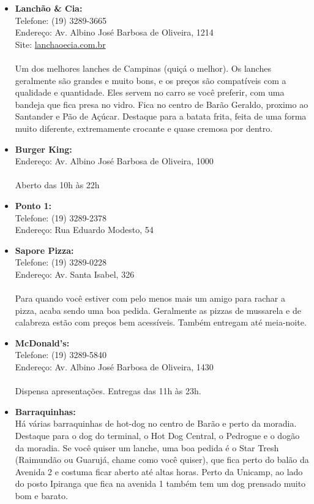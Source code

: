 \begin{itemize}
\item   \textbf{Lanchão \& Cia:}
        \\Telefone: (19) 3289-3665
        \\Endereço: Av. Albino José Barbosa de Oliveira, 1214
        \\Site: \url{lanchaoecia.com.br}
        \\\\Um dos melhores lanches de Campinas (quiçá o melhor). Os lanches
        geralmente são grandes e muito bons, e os preços são compatíveis com a
        qualidade e quantidade. Eles servem no carro se você preferir, com uma
        bandeja que fica presa no vidro. Fica no centro de Barão Geraldo,
        proximo ao Santander e Pão de Açúcar. Destaque para a batata frita,
        feita de uma forma muito diferente, extremamente crocante e quase
        cremosa por dentro.

\item   \textbf{Burger King:}
        \\Endereço: Av. Albino José Barbosa de Oliveira, 1000
        \\\\Aberto das 10h às 22h

\item   \textbf{Ponto 1:}
        \\Telefone: (19) 3289-2378
        \\Endereço: Rua Eduardo Modesto, 54

\item   \textbf{Sapore Pizza:}
        \\Telefone: (19) 3289-0228
        \\Endereço: Av. Santa Isabel, 326
        \\\\Para quando você estiver com pelo menos mais um amigo para rachar a
        pizza, acaba sendo uma boa pedida. Geralmente as pizzas de mussarela e
        de calabreza estão com preços bem acessíveis. Também entregam até
        meia-noite.

\item   \textbf{McDonald's:}
        \\Telefone: (19) 3289-5840
        \\Endereço: Av. Albino José Barbosa de Oliveira, 1430
        \\\\Dispensa apresentações. Entregas das 11h às 23h.

\item   \textbf{Barraquinhas:}
        \\Há várias barraquinhas de hot-dog no centro de Barão e perto da
        moradia. Destaque para o dog do terminal, o Hot Dog Central, o Pedrogue
        e o dogão da moradia. Se você quiser um lanche, uma boa pedida é o Star
        Tresh (Raimundão ou Guarujá, chame como você quiser), que fica perto do
        balão da Avenida 2 e costuma ficar aberto até altas horas. Perto da
        Unicamp, ao lado do posto Ipiranga que fica na avenida 1 também tem um
        dog prensado muito bom e barato.
\end{itemize}

